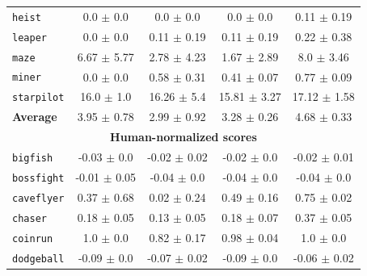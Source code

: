 \documentclass{article}
\begin{document}
\begin{table}[h]
\begin{tabular}{@{} l c c c c@{}}
    \texttt{heist}      &                    0.0 $\pm$ 0.0 &                     0.0 $\pm$ 0.0 &                     0.0 $\pm$ 0.0 &             0.11 $\pm$ 0.19 \\
    \texttt{leaper}     &                    0.0 $\pm$ 0.0 &                   0.11 $\pm$ 0.19 &                   0.11 $\pm$ 0.19 &             0.22 $\pm$ 0.38 \\
    \texttt{maze}       &                  6.67 $\pm$ 5.77 &                   2.78 $\pm$ 4.23 &                   1.67 $\pm$ 2.89 &              8.0 $\pm$ 3.46 \\
    \texttt{miner}     &                    0.0 $\pm$ 0.0 &                   0.58 $\pm$ 0.31 &                   0.41 $\pm$ 0.07 &             0.77 $\pm$ 0.09 \\
    \texttt{starpilot} &                   16.0 $\pm$ 1.0 &                   16.26 $\pm$ 5.4 &                  15.81 $\pm$ 3.27 &            17.12 $\pm$ 1.58 \\
    \textbf{Average}              &                  3.95 $\pm$ 0.78 &                   2.99 $\pm$ 0.92 &                   3.28 $\pm$ 0.26 &             4.68 $\pm$ 0.33 \\
    \midrule
    \multicolumn{5}{c}{\textbf{Human-normalized scores}} \\
    \texttt{bigfish}            &                  -0.03 $\pm$ 0.0 &                  -0.02 $\pm$ 0.02 &                   -0.02 $\pm$ 0.0 &            -0.02 $\pm$ 0.01 \\
    \texttt{bossfight}          &                 -0.01 $\pm$ 0.05 &                   -0.04 $\pm$ 0.0 &                   -0.04 $\pm$ 0.0 &             -0.04 $\pm$ 0.0 \\
    \texttt{caveflyer}          &                  0.37 $\pm$ 0.68 &                   0.02 $\pm$ 0.24 &                   0.49 $\pm$ 0.16 &             0.75 $\pm$ 0.02 \\
    \texttt{chaser}             &                  0.18 $\pm$ 0.05 &                   0.13 $\pm$ 0.05 &                   0.18 $\pm$ 0.07 &             0.37 $\pm$ 0.05 \\
    \texttt{coinrun}            &                    1.0 $\pm$ 0.0 &                   0.82 $\pm$ 0.17 &                   0.98 $\pm$ 0.04 &               1.0 $\pm$ 0.0 \\
    \texttt{dodgeball}          &                  -0.09 $\pm$ 0.0 &                  -0.07 $\pm$ 0.02 &                   -0.09 $\pm$ 0.0 &            -0.06 $\pm$ 0.02 \\

\end{tabular}
\end{table}
\end{document}
